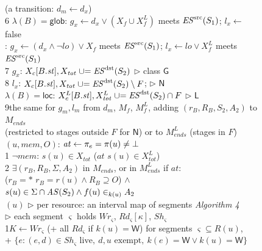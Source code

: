 \begin{figure}[tp]
\begin{minipage}[t]{0.49\textwidth}
\begin{tabbing}
\>\>(a transition: $d_m \gets d_x$) \\
6\> $\lambda(B) = \mathsf{glob}$: $g_x \gets d_x \vee (X_f \cup X^L_f)$ meets $\mathit{ES}^{\mathrm{src}}(S_1)$; $l_x \gets$ false \\
\>: $g_x \gets (d_x \wedge \neg\mathit{lo}) \vee X_f$ meets $\mathit{ES}^{\mathrm{src}}(S_1)$; $l_x \gets \mathit{lo} \vee X^L_f$ meets $\mathit{ES}^{\mathrm{src}}(S_1)$ \\
7\> $g_x$: $X_c[B.\mathit{st}], X_{\mathit{tot}} \mathrel{\cup}= \mathit{ES}^{\mathrm{dst}}(S_2)$ \hfill $\triangleright$ class $\mathsf{G}$ \\
8\> $l_x$: $X_c[B.\mathit{st}], X_{\mathit{tot}} \mathrel{\cup}= \mathit{ES}^{\mathrm{dst}}(S_2) \setminus F$; \hfill $\triangleright$ $\mathsf{N}$ \\
\>\> $\lambda(B) = \mathsf{loc}$: $X^L_c[B.\mathit{st}], X^L_{\mathit{tot}} \mathrel{\cup}= \mathit{ES}^{\mathrm{dst}}(S_2) \cap F$ \hfill $\triangleright$ $\mathsf{L}$ \\
9\>the same for $g_m, l_m$ from $d_m$, $M_f$, $M^L_f$, adding $(r_B, R_B, S_2, A_2)$ to $M_{\mathit{ends}}$ \\
\>\>(restricted to stages outside $F$ for $\mathsf{N}$) or to $M^L_{\mathit{ends}}$ (stages in $F$) \\
 $(u, \mathit{mem}, O)$: \quad $\mathit{at} \gets \pi_e = \pi(u) \ne \bot$ \\
1\> $\neg\mathit{mem}$:  $s(u) \in X_{\mathit{tot}}$  ($\mathit{at}$  $s(u) \in X^L_{\mathit{tot}}$) \\
2\> $\exists (r_B, R_B, \Sigma, A_2)$ in $M_{\mathit{ends}}$, or in $M^L_{\mathit{ends}}$ if $\mathit{at}$: \\
\>\>($r_B{=}\ast$  $r_B{=}r(u) \wedge R_B \supseteq O$) $\wedge$ $s(u) \in \Sigma \cap \mathit{AS}(S_2) \wedge f(u) \in_{k(u)} A_2$ \\[3pt]
 $(u)$ \quad $\triangleright$ per resource: an interval map of segments \hfill \emph{Algorithm 4} \\
\>\>$\triangleright$ each segment $\varsigma$ holds $\mathit{Wr}_\varsigma$, $\mathit{Rd}_\varsigma[\kappa]$, $\mathit{Sh}_\varsigma$ \\
1\>$K \gets \mathit{Wr}_\varsigma$ (+ all $\mathit{Rd}_\varsigma$ if $k(u){=}\mathsf{W}$) for segments $\varsigma \subseteq R(u)$, \\
\>\>+ $\{e : (e,d) \in \mathit{Sh}_\varsigma \text{ live},\ d,u \text{ exempt},\ k(e){=}\mathsf{W} \vee k(u){=}\mathsf{W}\}$ \\

\end{tabbing}
\end{minipage}
\end{figure}
